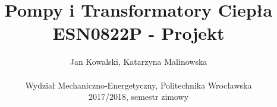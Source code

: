 \documentclass[12pt,a4paper]{article}
\begin{document}
\title{Pompy i Transformatory Ciepła ESN0822P - Projekt} %
\author{Jan Kowalski, Katarzyna Malinowska \\ %
	\\
	Wydział Mechaniczno-Energetyczny, Politechnika Wrocławska \\
	2017/2018, semestr zimowy
	}

\maketitle

\tableofcontents







%
%






\end{document}
